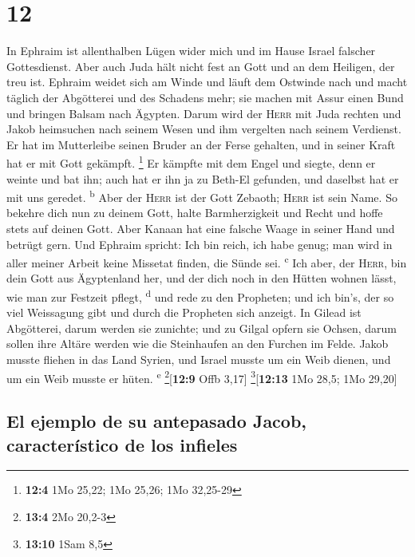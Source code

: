 \hypertarget{section-11}{%
\section{12}\label{section-11}}

 In Ephraim ist allenthalben Lügen wider mich und im Hause
Israel falscher Gottesdienst. Aber auch Juda hält nicht fest an Gott und
an dem Heiligen, der treu ist.  Ephraim weidet sich am
Winde und läuft dem Ostwinde nach und macht täglich der Abgötterei und
des Schadens mehr; sie machen mit Assur einen Bund und bringen Balsam
nach Ägypten.  Darum wird der \textsc{Herr} mit Juda
rechten und Jakob heimsuchen nach seinem Wesen und ihm vergelten nach
seinem Verdienst.  Er hat im Mutterleibe seinen Bruder an
der Ferse gehalten, und in seiner Kraft hat er mit Gott gekämpft.
\footnote{\textbf{12:4} 1Mo 25,22; 1Mo 25,26; 1Mo 32,25-29}
 Er kämpfte mit dem Engel und siegte, denn er weinte und
bat ihn; auch hat er ihn ja zu Beth-El gefunden, und daselbst hat er mit
uns geredet. \textsuperscript{b}  Aber der \textsc{Herr}
ist der Gott Zebaoth; \textsc{Herr} ist sein Name.  So
bekehre dich nun zu deinem Gott, halte Barmherzigkeit und Recht und
hoffe stets auf deinen Gott.  Aber Kanaan hat eine falsche
Waage in seiner Hand und betrügt gern.  Und Ephraim
spricht: Ich bin reich, ich habe genug; man wird in aller meiner Arbeit
keine Missetat finden, die Sünde sei. \textsuperscript{c}
 Ich aber, der \textsc{Herr}, bin dein Gott aus
Ägyptenland her, und der dich noch in den Hütten wohnen lässt, wie man
zur Festzeit pflegt, \textsuperscript{d}  und rede zu den
Propheten; und ich bin's, der so viel Weissagung gibt und durch die
Propheten sich anzeigt.  In Gilead ist Abgötterei, darum
werden sie zunichte; und zu Gilgal opfern sie Ochsen, darum sollen ihre
Altäre werden wie die Steinhaufen an den Furchen im Felde.
 Jakob musste fliehen in das Land Syrien, und Israel
musste um ein Weib dienen, und um ein Weib musste er hüten.
\textsuperscript{e} \footnote{\textbf{13:4} 2Mo 20,2-3}{[}\textbf{12:9}
Offb 3,17{]} \footnote{\textbf{13:10} 1Sam 8,5}{[}\textbf{12:13} 1Mo
28,5; 1Mo 29,20{]}

\hypertarget{el-ejemplo-de-su-antepasado-jacob-caracteruxedstico-de-los-infieles}{%
\subsection{El ejemplo de su antepasado Jacob, característico de los
infieles}\label{el-ejemplo-de-su-antepasado-jacob-caracteruxedstico-de-los-infieles}}

